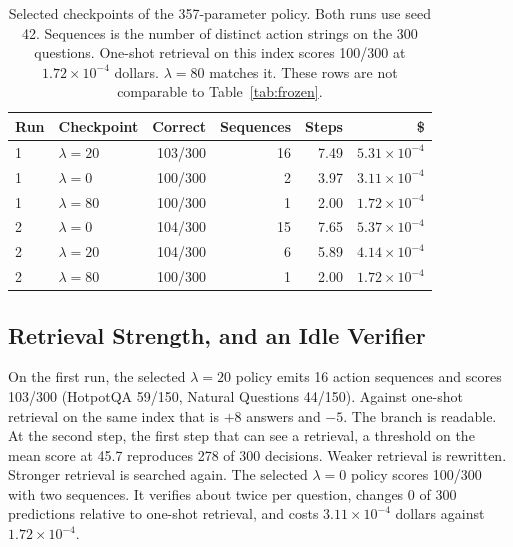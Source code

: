 \documentclass[letterpaper]{article} %
\begin{document}
\begin{table}[t]
\centering
\small
\setlength{\tabcolsep}{4pt}
\begin{tabular}{llrrrr}
\toprule
Run & Checkpoint & Correct & Sequences & Steps & \$ \\
\midrule
1 & \(\lambda{=}20\) & 103/300 & 16 & 7.49 & \(5.31\times 10^{-4}\) \\
1 & \(\lambda{=}0\) & 100/300 & 2 & 3.97 & \(3.11\times 10^{-4}\) \\
1 & \(\lambda{=}80\) & 100/300 & 1 & 2.00 & \(1.72\times 10^{-4}\) \\
2 & \(\lambda{=}0\) & 104/300 & 15 & 7.65 & \(5.37\times 10^{-4}\) \\
2 & \(\lambda{=}20\) & 104/300 & 6 & 5.89 & \(4.14\times 10^{-4}\) \\
2 & \(\lambda{=}80\) & 100/300 & 1 & 2.00 & \(1.72\times 10^{-4}\) \\
\bottomrule
\end{tabular}
\caption{Selected checkpoints of the 357-parameter policy. Both runs use seed 42. Sequences is the number of distinct action strings on the 300 questions. One-shot retrieval on this index scores 100/300 at \(1.72\times 10^{-4}\) dollars. \(\lambda{=}80\) matches it. These rows are not comparable to Table~\ref{tab:frozen}.}
\label{tab:learned}
\end{table}

\subsection{Retrieval Strength, and an Idle Verifier}
On the first run, the selected \(\lambda{=}20\) policy emits 16 action sequences and scores 103/300 (HotpotQA 59/150, Natural Questions 44/150). Against one-shot retrieval on the same index that is \(+8\) answers and \(-5\). The branch is readable. At the second step, the first step that can see a retrieval, a threshold on the mean score at 45.7 reproduces 278 of 300 decisions. Weaker retrieval is rewritten. Stronger retrieval is searched again. The selected \(\lambda{=}0\) policy scores 100/300 with two sequences. It verifies about twice per question, changes 0 of 300 predictions relative to one-shot retrieval, and costs \(3.11\times 10^{-4}\) dollars against \(1.72\times 10^{-4}\).
\end{document}
